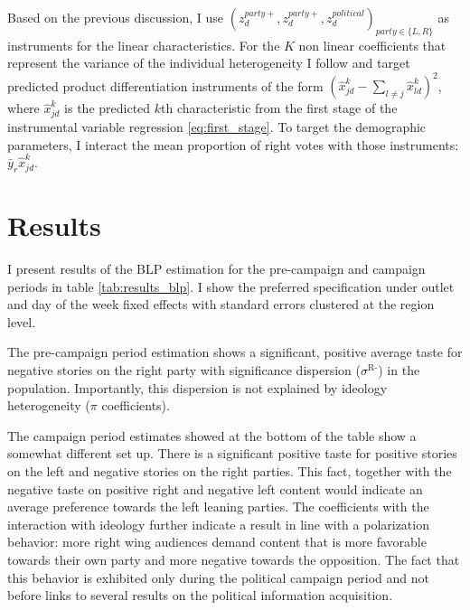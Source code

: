 \documentclass[12pt]{article}
\begin{document}
	
	
	

Based on the previous discussion, I use $\left(z_d^{party+},z_d^{party+}, z_d^{political}\right)_{party \in \{L,R\}}$	as instruments for the linear characteristics. For the $ K $ non linear coefficients that represent the variance of the individual heterogeneity I follow \cite{gandhi2019measuring} and target predicted product differentiation instruments of the form $ \left(\hat{x}_{jd}^k- \sum_{l \neq j} \hat{x}_{ld}^k\right)^2 $, where $ \hat{x}_{jd}^k $ is the predicted $ k $th characteristic from the first stage of the instrumental variable regression \ref{eq:first_stage}. To target the demographic parameters, I interact the mean proportion of right votes with those instruments: $ \bar{y}_r\hat{x}_{jd}^k $.
	

	
	
	\section{Results}
	
	\label{section:results}
	
	
	I present results of the BLP estimation for the pre-campaign and campaign periods in table   \ref{tab:results_blp}. I show the preferred specification under outlet and day of the week fixed effects with standard errors clustered at the region level. 
	
	The pre-campaign period estimation shows a significant, positive average taste for negative stories on the right party with significance dispersion ($\sigma^{\text{R-}}$) in the population. Importantly, this dispersion is not explained by ideology heterogeneity ($\pi$ coefficients).
	
	
	
	The campaign period estimates showed at the bottom of the table show a somewhat different set up. There is a significant positive taste for positive stories on the left and negative stories on the right parties. This fact, together with the negative taste on positive right and negative left content would indicate an average preference towards the left leaning parties. The coefficients with the interaction with ideology further indicate a result in line with a polarization behavior: more right wing audiences demand content that is more favorable towards their own party and more negative towards the opposition. The fact that this behavior is exhibited only during the political campaign period and not before links to several results on the political information acquisition.  
	
\end{document}
